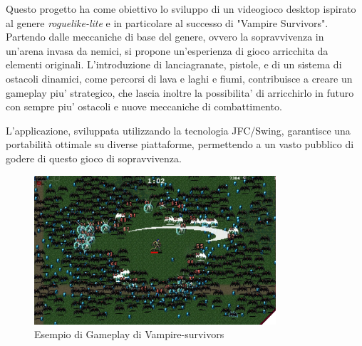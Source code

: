 \documentclass[12pt,a4paper]{report}
\begin{document}
Questo progetto ha come obiettivo lo sviluppo di un videogioco desktop  ispirato al genere \emph{roguelike-lite} e
in particolare al successo di "Vampire Survivors". Partendo dalle meccaniche di base del genere, ovvero la sopravvivenza in
un'arena invasa da nemici, si propone un'esperienza di gioco arricchita da elementi originali. L'introduzione di lanciagranate,
pistole, e di un sistema di ostacoli dinamici, come percorsi di lava e laghi e fiumi, contribuisce a creare un gameplay piu' strategico,
che lascia inoltre la possibilita' di arricchirlo in futuro con sempre piu' ostacoli e nuove meccaniche di combattimento.

\medskip
L'applicazione, sviluppata utilizzando la tecnologia JFC/Swing, garantisce una portabilità ottimale su diverse piattaforme,
permettendo a un vasto pubblico di godere di questo gioco di sopravvivenza.
\begin{figure}[h]
    \centering
    \includegraphics[width=0.8\textwidth]{vs}
    \caption{Esempio di Gameplay di Vampire-survivors}
    \label{fig:enter-label}
\end{figure}

\newpage
\end{document}
